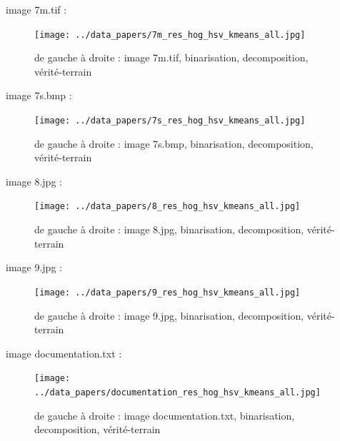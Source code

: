 \documentclass{book}
\begin{document}
image 7m.tif : 
\begin{figure}[H]
\begin{center}
\texttt{[image: ../data\_papers/7m\_res\_hog\_hsv\_kmeans\_all.jpg]}
\end{center}
\caption{de gauche à droite : image 7m.tif, binarisation, decomposition, vérité-terrain}
\label{7m}
\end{figure}
\clearpage


image 7s.bmp : 
\begin{figure}[H]
\begin{center}
\texttt{[image: ../data\_papers/7s\_res\_hog\_hsv\_kmeans\_all.jpg]}
\end{center}
\caption{de gauche à droite : image 7s.bmp, binarisation, decomposition, vérité-terrain}
\label{7s}
\end{figure}
\clearpage


image 8.jpg : 
\begin{figure}[H]
\begin{center}
\texttt{[image: ../data\_papers/8\_res\_hog\_hsv\_kmeans\_all.jpg]}
\end{center}
\caption{de gauche à droite : image 8.jpg, binarisation, decomposition, vérité-terrain}
\label{8}
\end{figure}
\clearpage


image 9.jpg : 
\begin{figure}[H]
\begin{center}
\texttt{[image: ../data\_papers/9\_res\_hog\_hsv\_kmeans\_all.jpg]}
\end{center}
\caption{de gauche à droite : image 9.jpg, binarisation, decomposition, vérité-terrain}
\label{9}
\end{figure}
\clearpage


image documentation.txt : 
\begin{figure}[H]
\begin{center}
\texttt{[image: ../data\_papers/documentation\_res\_hog\_hsv\_kmeans\_all.jpg]}
\end{center}
\caption{de gauche à droite : image documentation.txt, binarisation, decomposition, vérité-terrain}
\label{documentation}
\end{figure}
\clearpage





\clearpage

\backmatter

\listoftables

\listoffigures



\end{document}
